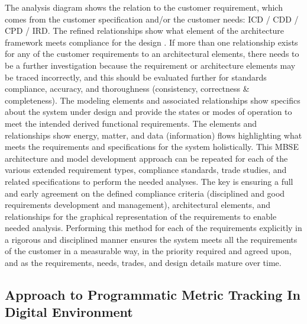 \documentclass[num-refs]{wiley-article}
\begin{document}
The analysis diagram shows the relation to the customer requirement, which comes from the customer specification and/or the customer needs: ICD / CDD / CPD / IRD. The refined relationships show what element of the architecture framework meets compliance for the design \cite{Friedenthal2008}. If more than one relationship exists for any of the customer requirements to an architectural elements, there needs to be a further investigation because the requirement or architecture elements may be traced incorrectly, and this should be evaluated further for standards compliance, accuracy, and thoroughness (consistency, correctness \& completeness). The modeling elements and associated relationships show specifics about the system under design and provide the states or modes of operation to meet the intended derived functional requirements. The elements and relationships show energy, matter, and data (information) flows highlighting what meets the requirements and specifications for the system holistically. This MBSE architecture and model development approach can be repeated for each of the various extended requirement types, compliance standards, trade studies, and related specifications to perform the needed analyses. The key is ensuring a full and early agreement on the defined compliance criteria (disciplined and good requirements development and management),  architectural elements, and relationships for the graphical representation of the requirements to enable needed analysis. Performing this method for each of the requirements explicitly in a rigorous and disciplined manner ensures the system meets all the requirements of the customer in a measurable way, in the priority required and agreed upon, and as the requirements, needs, trades, and design details mature over time.

\subsection{Approach to Programmatic Metric Tracking In Digital Environment}
\label{Approach to Programmatic Metric Tracking}
\end{document}
